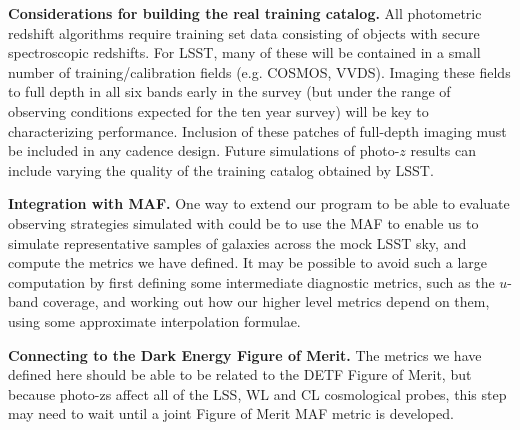 \textbf{Considerations for building the real training catalog.} All
photometric redshift algorithms require training set data consisting of
objects with secure spectroscopic redshifts.  For LSST, many of these
will be contained in a small number of training/calibration fields (e.g.
COSMOS, VVDS).  Imaging these fields to full depth in all six bands
early in the survey (but under the range of observing conditions
expected for the ten year survey) will be key to characterizing
performance.  Inclusion of these patches of full-depth imaging must be
included in any cadence design. Future simulations of photo-$z$ results
can include varying the quality of the training catalog obtained by
LSST.

\textbf{Integration with MAF.} One way to extend our program to be able
to evaluate observing strategies simulated with \OpSim could be to use
the MAF to enable us to simulate representative samples of galaxies
across the mock LSST sky, and compute the metrics we have defined.
It may be possible to avoid such a large computation by first defining
some intermediate diagnostic metrics, such as the $u$-band coverage, and
working out how our higher level metrics depend on them, using some
approximate interpolation formulae.

\textbf{Connecting to the Dark Energy Figure of Merit.} The metrics we
have defined here should be able to be related to the DETF Figure of
Merit, but because photo-zs affect all of the LSS, WL and CL
cosmological probes, this step may need to wait until a joint
Figure of Merit MAF metric is developed.


